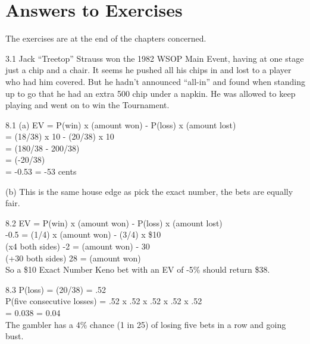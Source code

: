 \chapter{Answers to Exercises}

The exercises are at the end of the chapters concerned.

3.1 Jack ``Treetop'' Strauss won the 1982 WSOP Main Event,
having at one stage just a chip and a chair. It
seems he pushed all his chips in and lost to a player who had him
covered. But he hadn't announced ``all-in'' and found when standing up
to go that he had an extra 500 chip under a napkin. He was allowed to
keep playing and went on to win the Tournament.

8.1 (a) EV = P(win) x (amount won) - P(loss) x (amount lost) \\
= (18/38) x 10 - (20/38) x 10 \\
= (180/38 - 200/38) \\
= (-20/38) \\
= -0.53 = -53 cents

(b) This is the same house edge as pick the exact number, the bets are
equally fair.

8.2 EV = P(win) x (amount won) - P(loss) x (amount lost) \\
-0.5  = (1/4)  x (amount won) - (3/4) x \$10 \\
(x4 both sides) -2 = (amount won) - 30 \\
(+30 both sides) 28 = (amount won) \\

So a \$10 Exact Number Keno bet with an EV of -5\% should return
\$38.

8.3 P(loss) = (20/38) = .52 \\
P(five consecutive losses)  = .52 x .52 x .52 x .52 x .52 \\
= 0.038 = 0.04 \\

The gambler has a 4\% chance (1 in 25) of losing five bets in a row
and going bust.

